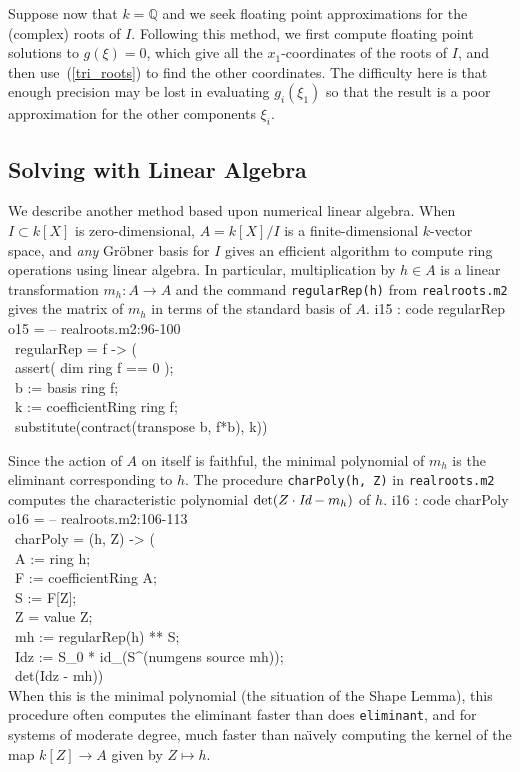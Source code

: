 Suppose now that $k={\mathbb Q}$ and we seek floating point approximations
for the (complex) roots of $I$.
Following this method, we first compute floating point solutions to
$g(\xi)=0$, which give all the $x_1$-coordinates of the roots of $I$,  and
then use~(\ref{tri_roots}) to find the other coordinates.
The difficulty here is that enough precision may be lost in evaluating
$g_i(\xi_1)$ so that the result is a poor approximation for the other
components $\xi_i$.


\subsection{Solving with Linear Algebra}
We describe another method based upon numerical linear algebra.
When $I\subset k[X]$ is zero-dimensional, $A=k[X]/I$ is a finite-dimensional 
$k$-vector space, and {\it any} Gr\"obner basis for $I$ gives an efficient
algorithm to compute ring operations using linear algebra.
In particular, multiplication by $h\in A$ is a linear transformation 
$m_h:A\to A$ and the command {\tt regularRep(h)} from 
{\tt realroots.m2} gives the matrix of $m_h$ in
terms of the standard basis of $A$.
%
\beginOutput
i15 : code regularRep\\
\emptyLine
o15 = -- realroots.m2:96-100\\
\      regularRep = f -> (\\
\           assert( dim ring f == 0 );\\
\           b := basis ring f;\\
\           k := coefficientRing ring f;\\
\           substitute(contract(transpose b, f*b), k))\\
\endOutput
%

Since the action of $A$ on itself is faithful, the minimal polynomial of 
$m_h$ is the eliminant corresponding to $h$.
The procedure {\tt charPoly(h, Z)} in {\tt realroots.m2}
computes the characteristic polynomial 
$\det(Z\cdot\mbox{\it Id} - m_h)$ of $h$.
%
\beginOutput
i16 : code charPoly\\
\emptyLine
o16 = -- realroots.m2:106-113\\
\      charPoly = (h, Z) -> (\\
\           A := ring h;\\
\           F := coefficientRing A;\\
\           S := F[Z];\\
\           Z  = value Z;     \\
\           mh := regularRep(h) ** S;\\
\           Idz := S_0 * id_(S^(numgens source mh));\\
\           det(Idz - mh))\\
\endOutput
%
When this is the minimal polynomial (the situation of the Shape Lemma),
this procedure often computes the eliminant faster than does 
{\tt eliminant}, and for systems of moderate degree, much faster than
na\"\i vely computing the kernel of the map $k[Z]\to A$ given by $Z\mapsto h$.

